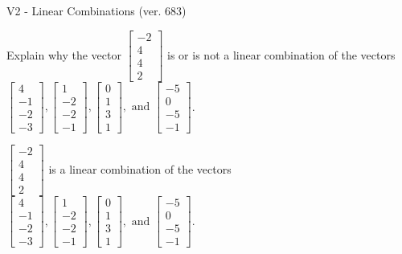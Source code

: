 \begin{exercise}
  \begin{exerciseTitle}V2 - Linear Combinations (ver. 683)\end{exerciseTitle}
  \begin{exerciseStatement}
    Explain why the vector \(\left[\begin{array}{c}
-2 \\
4 \\
4 \\
2
\end{array}\right]\)  is or is not a linear 
	combination of the vectors \(\left[\begin{array}{c}
4 \\
-1 \\
-2 \\
-3
\end{array}\right] , \left[\begin{array}{c}
1 \\
-2 \\
-2 \\
-1
\end{array}\right] , \left[\begin{array}{c}
0 \\
1 \\
3 \\
1
\end{array}\right] , \text{ and } \left[\begin{array}{c}
-5 \\
0 \\
-5 \\
-1
\end{array}\right]\).
	


  \end{exerciseStatement}
  \begin{exerciseAnswer}
   \(\left[\begin{array}{c}
-2 \\
4 \\
4 \\
2
\end{array}\right]\) 
  	 is  
	a linear combination of the vectors \(\left[\begin{array}{c}
4 \\
-1 \\
-2 \\
-3
\end{array}\right] , \left[\begin{array}{c}
1 \\
-2 \\
-2 \\
-1
\end{array}\right] , \left[\begin{array}{c}
0 \\
1 \\
3 \\
1
\end{array}\right] , \text{ and } \left[\begin{array}{c}
-5 \\
0 \\
-5 \\
-1
\end{array}\right]\).


\end{exerciseAnswer}
\end{exercise}

